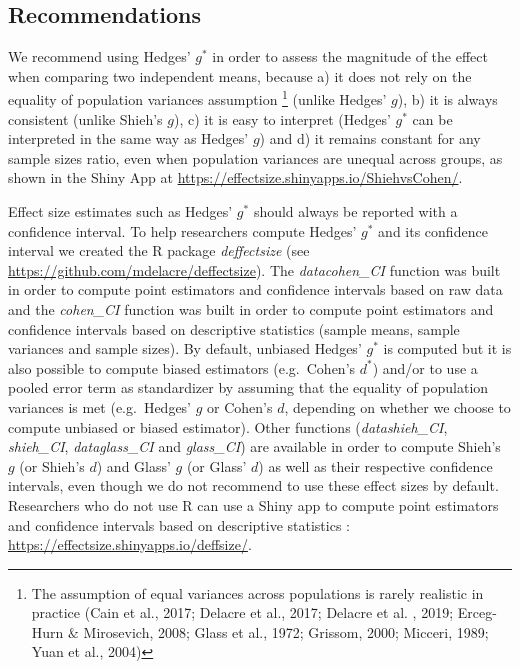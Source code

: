 \documentclass[
  english,
  man,floatsintext]{apa6}
\begin{document}
\hypertarget{recommendations}{%
\subsection{Recommendations}\label{recommendations}}

We recommend using Hedges' \(g^*\) in order to assess the magnitude of the effect when comparing two independent means, because a) it does not rely on the equality of population variances assumption \footnote{The assumption of equal variances across populations is rarely realistic in practice (Cain et al., 2017; Delacre et al., 2017; Delacre et al. , 2019; Erceg-Hurn $\&$ Mirosevich, 2008; Glass et al., 1972; Grissom, 2000; Micceri, 1989; Yuan et al., 2004)} (unlike Hedges' \(g\)), b) it is always consistent (unlike Shieh's \(g\)), c) it is easy to interpret (Hedges' \(g^*\) can be interpreted in the same way as Hedges' \(g\)) and d) it remains constant for any sample sizes ratio, even when population variances are unequal across groups, as shown in the Shiny App at \url{https://effectsize.shinyapps.io/ShiehvsCohen/}.

Effect size estimates such as Hedges' \(g^*\) should always be reported with a confidence interval. To help researchers compute Hedges' \(g^*\) and its confidence interval we created the R package \emph{deffectsize} (see \url{https://github.com/mdelacre/deffectsize}). The \emph{datacohen\_CI} function was built in order to compute point estimators and confidence intervals based on raw data and the \emph{cohen\_CI} function was built in order to compute point estimators and confidence intervals based on descriptive statistics (sample means, sample variances and sample sizes). By default, unbiased Hedges' \(g^*\) is computed but it is also possible to compute biased estimators (e.g.~Cohen's \(d^*\)) and/or to use a pooled error term as standardizer by assuming that the equality of population variances is met (e.g.~Hedges' \(g\) or Cohen's \(d\), depending on whether we choose to compute unbiased or biased estimator). Other functions (\emph{datashieh\_CI}, \emph{shieh\_CI}, \emph{dataglass\_CI} and \emph{glass\_CI}) are available in order to compute Shieh's \(g\) (or Shieh's \(d\)) and Glass' \(g\) (or Glass' \(d\)) as well as their respective confidence intervals, even though we do not recommend to use these effect sizes by default. Researchers who do not use R can use a Shiny app to compute point estimators and confidence intervals based on descriptive statistics : \url{https://effectsize.shinyapps.io/deffsize/}.
\end{document}
